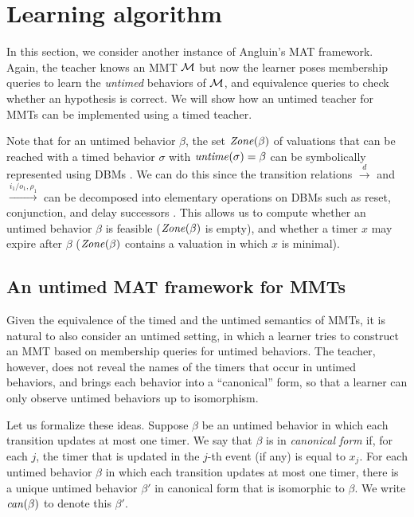 \section{Learning algorithm}  
\label{algorithm}
In this section, we consider another instance of Angluin's MAT framework.
Again, the teacher knows an MMT ${\mathcal M}$ but now the learner poses membership queries
to learn the \emph{untimed} behaviors of ${\mathcal M}$, and equivalence queries to check whether an hypothesis is correct.
%
We will show how an untimed teacher for MMTs can be implemented using a timed teacher.

\ifshort
Note that for an untimed behavior $\beta$, the set $\mathit{Zone}({\beta})$ of valuations that can be reached with a timed behavior $\sigma$ with $\mathit{untime}(\sigma) = \beta$ can be symbolically represented using DBMs \cite{Di89}.
We can do this since the transition relations $\xrightarrow{d}$ and $\xrightarrow{i_1/o_1, \rho_1}$ can be decomposed 
into elementary operations on DBMs such as reset, conjunction, and delay successors \cite{BengtssonY03}.
This allows us to compute whether an untimed behavior $\beta$ is feasible ($\mathit{Zone}({\beta})$ is empty), and
whether a timer $x$ may expire after $\beta$ ($\mathit{Zone}({\beta})$ contains a valuation in which $x$ is minimal).
\fi

\subsection{An untimed MAT framework for MMTs}
Given the equivalence of the timed and the untimed semantics of MMTs, it is natural to also 
consider an untimed setting, in which a learner tries to construct an MMT based on membership queries for untimed behaviors.
The teacher, however, does not reveal the names of the timers that occur in untimed behaviors, and brings each behavior into a
``canonical'' form, so that a learner can only observe untimed behaviors up to isomorphism.

Let us formalize these ideas.
Suppose $\beta$ be an untimed behavior in which each transition updates at most one timer.
We say that $\beta$ is in \emph{canonical form} if, for each $j$, the timer that is updated in the $j$-th event
(if any) is equal to $x_j$.
For each untimed behavior $\beta$ in which each transition updates at most one timer, there is a unique untimed behavior
$\beta'$ in canonical form that is isomorphic to $\beta$.
We write $\mathit{can}({\beta})$ to denote this $\beta'$.

